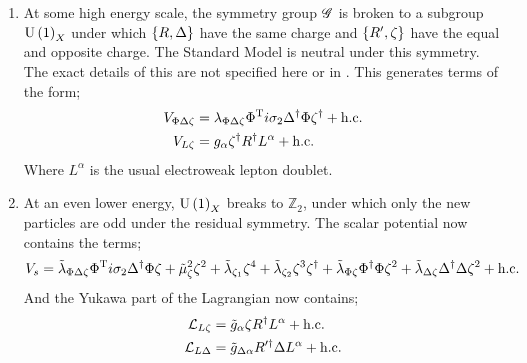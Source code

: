 \documentclass[10pt]{article}
\begin{document}
\begin{enumerate}
  \item At some high energy scale, the symmetry group $\mathscr{G}$ is broken to a subgroup $\textrm{U}\left(1\right)_X$ under which $\left\{R, \Delta\right\}$ have the same charge and $\left\{R^\prime, \zeta\right\}$ have the equal and opposite charge. The Standard Model is neutral under this symmetry. The exact details of this are not specified here or in \cite{Farzan2011, Farzan2010a}. This generates terms of the form;
  \begin{align}
    V_{\Phi\Delta\zeta} &= \lambda_{\Phi\Delta\zeta}\Phi^{\text{T}}i\sigma_2 \Delta^{\dagger} \Phi \zeta^{\dagger} + \text{h.c.} \\
    V_{L\zeta} &= g_\alpha \zeta^{\dagger} R^{\dagger} L^\alpha + \text{h.c.}
  \end{align}
  Where $L^\alpha$ is the usual electroweak lepton doublet.
  \item At an even lower energy, $\textrm{U}\left(1\right)_X$ breaks to $\mathbb{Z}_2$, under which only the new particles are odd under the residual symmetry. The scalar potential now contains the terms;
  \begin{dmath}
    V_s = \tilde{\lambda}_{\Phi\Delta\zeta}\Phi^{\text{T}}i\sigma_2\Delta\dagg\Phi\zeta + \tilde{\mu}_\zeta^2 \zeta^2 + \tilde{\lambda}_{\zeta_1}\zeta^4 + \tilde{\lambda}_{\zeta_2}\zeta^3\zeta\dagg + \tilde{\lambda}_{\Phi\zeta}\Phi\dagg\Phi \zeta^2 + \tilde{\lambda}_{\Delta\zeta}\Delta\dagg\Delta \zeta^2 + \text{h.c.}
  \end{dmath}
  And the Yukawa part of the Lagrangian now contains;
  \begin{align}
    \mathcal{L}_{L\zeta} &= \tilde{g}_\alpha \zeta R^{\dagger} L^\alpha + \text{h.c.} \label{eq:yukawa1}\\
    \mathcal{L}_{L\Delta} &= \tilde{g}_{\Delta \alpha} R^{\prime\dagger}\Delta L^\alpha + \text{h.c.} \label{eq:yukawa2}
  \end{align}
\end{enumerate}
\end{document}
